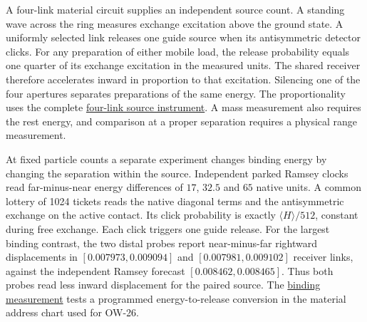 \documentclass[11pt]{article}
\begin{document}
A four-link material circuit supplies an independent source count.
A standing wave across the ring measures exchange excitation above
the ground state. A uniformly selected link releases one guide source
when its antisymmetric detector clicks. For any preparation of either
mobile load, the release probability equals one quarter of its exchange
excitation in the measured units. The shared receiver therefore
accelerates inward in proportion to that excitation. Silencing one of
the four apertures separates preparations of the same energy. The
proportionality uses the complete
\href{https://github.com/FloatingPragma/observer-patch-holography/tree/main/model/experiments/interval_echo_shell_flux/product_address/green_response/material_recoil/energy_source}{four-link source instrument}.
A mass measurement also requires the rest energy, and comparison at
a proper separation requires a physical range measurement.

At fixed particle counts a separate experiment changes binding energy
by changing the separation within the source. Independent parked
Ramsey clocks read far-minus-near energy differences of $17$, $32.5$
and $65$ native units. A common lottery of 1024 tickets reads the
native diagonal terms and the antisymmetric exchange on the active
contact. Its click probability is exactly $\langle H\rangle/512$,
constant during free exchange. Each click triggers one guide release.
For the largest binding contrast, the two distal probes report
near-minus-far rightward displacements in $[0.007973,0.009094]$
and $[0.007981,0.009102]$ receiver links, against the independent
Ramsey forecast $[0.008462,0.008465]$. Thus both probes read less
inward displacement for the paired source. The
\href{https://github.com/FloatingPragma/observer-patch-holography/tree/main/model/experiments/interval_echo_shell_flux/product_address/green_response/material_recoil/energy_source/binding}{binding measurement}
tests a programmed energy-to-release conversion in the material
address chart used for OW-26.
\end{document}
